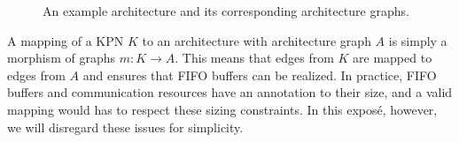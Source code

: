\documentclass[sigplan,10pt]{acmart}
\begin{document}
\begin{figure}[t!]
%
	\hfill
	\centering
	\caption{An example architecture and its corresponding architecture graphs.}
	\label{fig:actionsm1}
 \end{figure}
 
A mapping of a KPN $K$ to an architecture with architecture graph $A$ is simply a morphism of graphs $m: K \rightarrow A$.
This means that edges from $K$ are mapped to edges from $A$ and ensures that FIFO buffers can be realized.
In practice, FIFO buffers and communication resources have an annotation to their size, and a valid mapping would has to respect these sizing constraints.
In this exposé, however, we will disregard these issues for simplicity.
\end{document}

